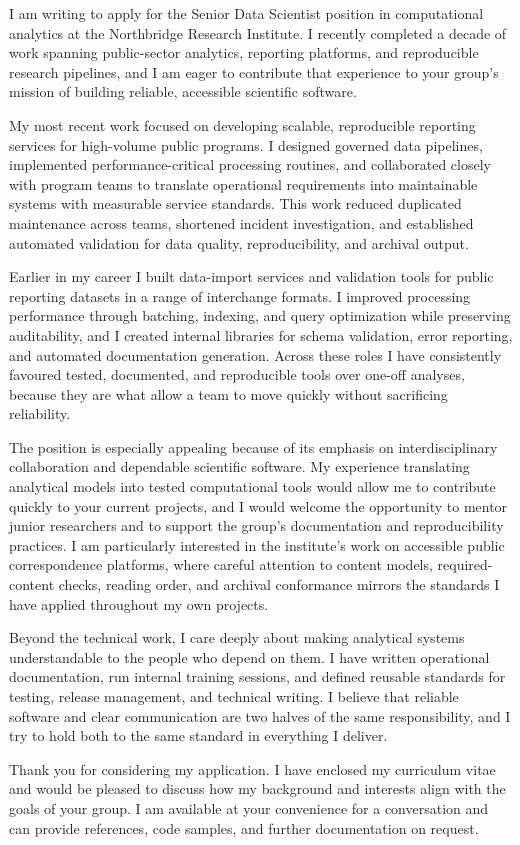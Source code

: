 \documentclass[medium=print]{careerdossier-letter}
\begin{document}
\MakeCDossierLetterhead

I am writing to apply for the Senior Data Scientist position in computational
analytics at the Northbridge Research Institute. I recently completed a decade
of work spanning public-sector analytics, reporting platforms, and reproducible
research pipelines, and I am eager to contribute that experience to your group's
mission of building reliable, accessible scientific software.

My most recent work focused on developing scalable, reproducible reporting
services for high-volume public programs. I designed governed data pipelines,
implemented performance-critical processing routines, and collaborated closely
with program teams to translate operational requirements into maintainable
systems with measurable service standards. This work reduced duplicated
maintenance across teams, shortened incident investigation, and established
automated validation for data quality, reproducibility, and archival output.

Earlier in my career I built data-import services and validation tools for
public reporting datasets in a range of interchange formats. I improved
processing performance through batching, indexing, and query optimization while
preserving auditability, and I created internal libraries for schema validation,
error reporting, and automated documentation generation. Across these roles I
have consistently favoured tested, documented, and reproducible tools over
one-off analyses, because they are what allow a team to move quickly without
sacrificing reliability.

The position is especially appealing because of its emphasis on interdisciplinary
collaboration and dependable scientific software. My experience translating
analytical models into tested computational tools would allow me to contribute
quickly to your current projects, and I would welcome the opportunity to mentor
junior researchers and to support the group's documentation and reproducibility
practices. I am particularly interested in the institute's work on accessible
public correspondence platforms, where careful attention to content models,
required-content checks, reading order, and archival conformance mirrors the
standards I have applied throughout my own projects.

Beyond the technical work, I care deeply about making analytical systems
understandable to the people who depend on them. I have written operational
documentation, run internal training sessions, and defined reusable standards for
testing, release management, and technical writing. I believe that reliable
software and clear communication are two halves of the same responsibility, and I
try to hold both to the same standard in everything I deliver.

Thank you for considering my application. I have enclosed my curriculum vitae and
would be pleased to discuss how my background and interests align with the goals
of your group. I am available at your convenience for a conversation and can
provide references, code samples, and further documentation on request.

\MakeCDossierClosing
\end{document}
